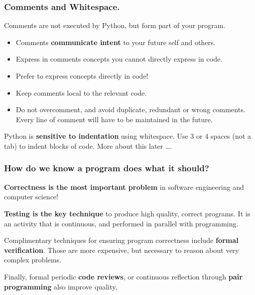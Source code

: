 \documentclass{beamer} %
\newcommand\emc[1]{\textcolor{brightblue}{\textbf{#1}}}
\begin{document}

\begin{frame}
\frametitle{Comments and Whitespace.}

Comments are not executed by Python, but form part of your program.
\begin{itemize}
\item Comments \emc{communicate intent} to your future self and others.
\item Express in comments concepts you cannot directly express in code.
\item Prefer to express concepts directly in code!
\item Keep comments local to the relevant code.
\item Do not overcomment, and avoid duplicate, redundant or wrong comments. Every line of comment will have to be maintained in the future.
\end{itemize}

Python is \emc{sensitive to indentation} using whitespace. Use 3 or 4 spaces (not a tab) to indent blocks of code. More about this later \ldots.

\end{frame}

\begin{frame}
\frametitle{How do we know a program does what it should?}

\emc{Correctness is the most important problem} in software engineering and computer science!

\vspace{3mm}
\emc{Testing is the key technique} to produce high quality, correct programs. It is an activity that is continuous, and performed in parallel with programming.

\vspace{3mm}
Complimentary techniques for ensuring program correctness include \emc{formal verification}. Those are more expensive, but necessary to reason about very complex problems.

\vspace{3mm}
Finally, formal periodic \emc{code reviews}, or continuous reflection through \emc{pair programming} also improve quality.

\end{frame}
\end{document}
